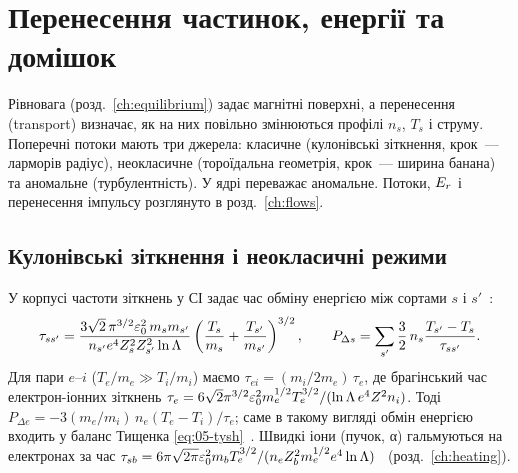 \chapter{Перенесення частинок, енергії та домішок}\label{ch:transport}

Рівновага (розд.~\ref{ch:equilibrium}) задає магнітні поверхні, а перенесення (transport) визначає, як на них повільно змінюються профілі $n_s$, $T_s$ і струму. Поперечні потоки мають три джерела: класичне (кулонівські зіткнення, крок~--- ларморів радіус), неокласичне (тороїдальна геометрія, крок~--- ширина банана) та аномальне (турбулентність). У ядрі переважає аномальне. Потоки, $E_{r}$ і перенесення імпульсу розглянуто в розд.~\ref{ch:flows}.

\section{Кулонівські зіткнення і неокласичні режими}\label{sec:05-coll}

У корпусі частоти зіткнень у СІ задає час обміну енергією між сортами $s$ і $s'$~\cite[с.~3, (14), (20)]{Seto2014}:
\begin{equation}\label{eq:05-tau}
  \tau_{ss'}=\frac{3\sqrt2\,\pi^{3/2}\varepsilon_0^2\,m_sm_{s'}}{n_{s'}e^4Z_s^2Z_{s'}^2\ln\Lambda}\left(\frac{T_s}{m_s}+\frac{T_{s'}}{m_{s'}}\right)^{3/2},\qquad
  P_{\Delta s}=\sum_{s'}\frac32\,n_s\frac{T_{s'}-T_s}{\tau_{ss'}} .
\end{equation}
Для пари $e$--$i$ ($T_e/m_e\gg T_i/m_i$) маємо $\tau_{ei}=(m_i/2m_e)\,\tau_e$, де брагінський час електрон-іонних зіткнень
$\tau_e=6\sqrt2\pi^{3/2}\varepsilon_0^2m_e^{1/2}T_e^{3/2}/(\ln\Lambda\,e^4Z^2n_i)$. Тоді $P_{\Delta e}=-3(m_e/m_i)\,n_e(T_e-T_i)/\tau_e$; саме в такому вигляді обмін енергією входить у баланс Тищенка \eqref{eq:05-tysh}~\cite[с.~109, (4.54)]{Tyshchenko2021}. Швидкі іони (пучок, α) гальмуються на електронах за час $\tau_{sb}=6\pi\sqrt{2\pi}\varepsilon_0^2m_bT_e^{3/2}/(n_eZ_b^2m_e^{1/2}e^4\ln\Lambda)$~\cite[с.~4, (8)]{Fukuyama1992} (розд.~\ref{ch:heating}).

